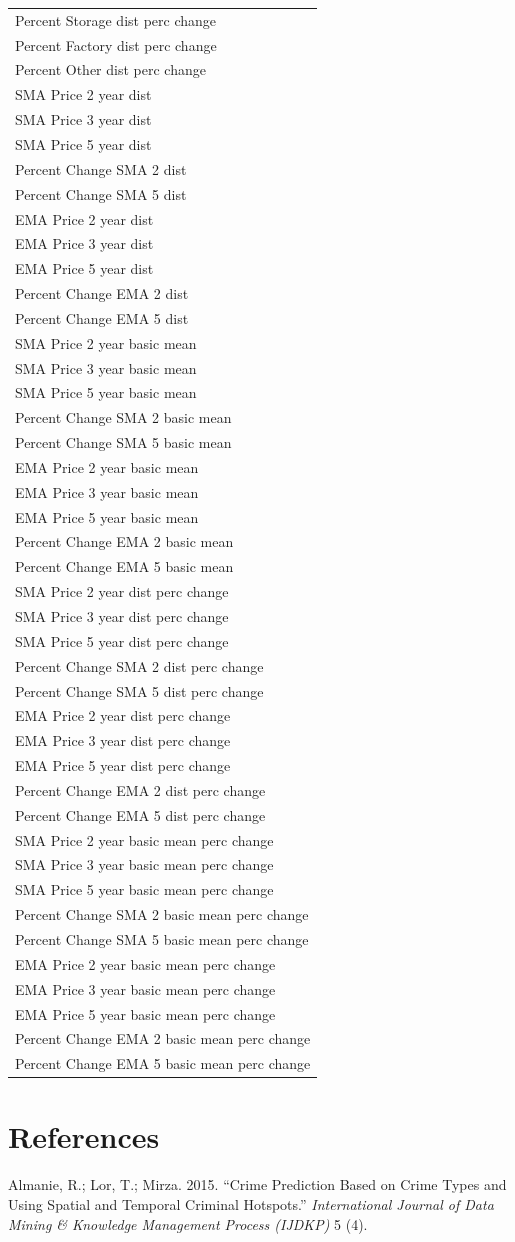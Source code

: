 \documentclass[12pt,]{article}
\begin{document}
\begin{longtable}[]{@{}l@{}}
Percent Storage dist perc change\tabularnewline
Percent Factory dist perc change\tabularnewline
Percent Other dist perc change\tabularnewline
SMA Price 2 year dist\tabularnewline
SMA Price 3 year dist\tabularnewline
SMA Price 5 year dist\tabularnewline
Percent Change SMA 2 dist\tabularnewline
Percent Change SMA 5 dist\tabularnewline
EMA Price 2 year dist\tabularnewline
EMA Price 3 year dist\tabularnewline
EMA Price 5 year dist\tabularnewline
Percent Change EMA 2 dist\tabularnewline
Percent Change EMA 5 dist\tabularnewline
SMA Price 2 year basic mean\tabularnewline
SMA Price 3 year basic mean\tabularnewline
SMA Price 5 year basic mean\tabularnewline
Percent Change SMA 2 basic mean\tabularnewline
Percent Change SMA 5 basic mean\tabularnewline
EMA Price 2 year basic mean\tabularnewline
EMA Price 3 year basic mean\tabularnewline
EMA Price 5 year basic mean\tabularnewline
Percent Change EMA 2 basic mean\tabularnewline
Percent Change EMA 5 basic mean\tabularnewline
SMA Price 2 year dist perc change\tabularnewline
SMA Price 3 year dist perc change\tabularnewline
SMA Price 5 year dist perc change\tabularnewline
Percent Change SMA 2 dist perc change\tabularnewline
Percent Change SMA 5 dist perc change\tabularnewline
EMA Price 2 year dist perc change\tabularnewline
EMA Price 3 year dist perc change\tabularnewline
EMA Price 5 year dist perc change\tabularnewline
Percent Change EMA 2 dist perc change\tabularnewline
Percent Change EMA 5 dist perc change\tabularnewline
SMA Price 2 year basic mean perc change\tabularnewline
SMA Price 3 year basic mean perc change\tabularnewline
SMA Price 5 year basic mean perc change\tabularnewline
Percent Change SMA 2 basic mean perc change\tabularnewline
Percent Change SMA 5 basic mean perc change\tabularnewline
EMA Price 2 year basic mean perc change\tabularnewline
EMA Price 3 year basic mean perc change\tabularnewline
EMA Price 5 year basic mean perc change\tabularnewline
Percent Change EMA 2 basic mean perc change\tabularnewline
Percent Change EMA 5 basic mean perc change\tabularnewline
\bottomrule
\end{longtable}

\section*{References}\label{references}

\hypertarget{refs}{}
\hypertarget{ref-Almanie2015}{}
Almanie, R.; Lor, T.; Mirza. 2015. ``Crime Prediction Based on Crime
Types and Using Spatial and Temporal Criminal Hotspots.''
\emph{International Journal of Data Mining \& Knowledge Management
Process (IJDKP)} 5 (4).
\end{document}
